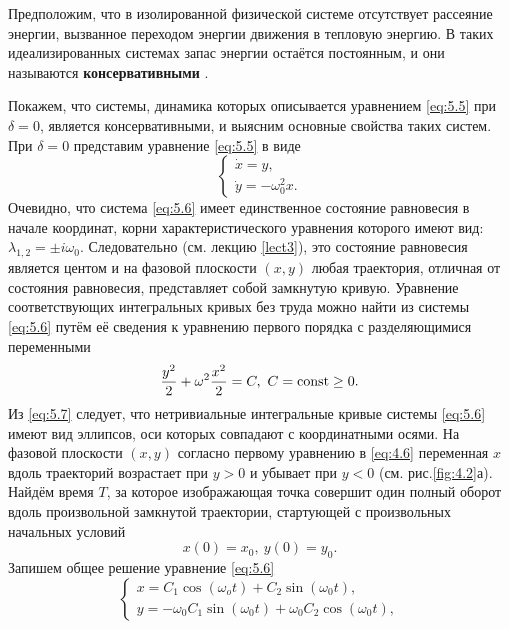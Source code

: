 Предположим, что в изолированной физической системе отсутствует
рассеяние энергии, вызванное переходом энергии движения в тепловую
энергию. В таких идеализированных системах запас энергии остаётся
постоянным, и они называются \textbf{консервативными} .

Покажем, что системы, динамика которых описывается уравнением \eqref{eq:5.5}    
при $\delta = 0$, является консервативными, и выясним основные свойства таких
систем. При $\delta = 0$ представим уравнение \eqref{eq:5.5} в виде
\begin{equation}
        \label{eq:5.6}
        \begin{cases}
                \dot x = y, \\
                \dot y = - \omega_0^2 x.
        \end{cases}
\end{equation}
Очевидно, что система \eqref{eq:5.6} имеет единственное состояние равновесия в начале координат, корни характеристического уравнения которого имеют вид: $\lambda_{1,2} = \pm i \omega_0$. Следовательно (см. лекцию \ref{lect3}), это состояние равновесия является центом и на фазовой плоскости $(x,y)$ любая траектория, отличная от состояния
равновесия, представляет собой замкнутую кривую. Уравнение
соответствующих интегральных кривых без труда можно найти из системы
 \eqref{eq:5.6} путём её сведения к уравнению первого порядка с разделяющимися
переменными 
\begin{equation}
        \label{eq:5.7}
        \frac{y^2}{2} + \omega^2 \frac{x^2}{2} = C,~ C= \textrm{const}\geq0.
\end{equation}
Из \eqref{eq:5.7} следует, что нетривиальные интегральные кривые системы \eqref{eq:5.6} имеют вид эллипсов, оси которых совпадают с координатными осями. На фазовой плоскости $(x,y)$ согласно первому уравнению
в \eqref{eq:4.6} переменная $x$ вдоль траекторий возрастает при $y>0$ и убывает при $y<0$ (см. рис.\ref{fig:4.2}а). Найдём время $T$, за которое изображающая точка совершит один полный оборот вдоль произвольной замкнутой траектории, стартующей с произвольных начальных условий
\begin{equation}
        \label{eq:5.8}
        x(0) = x_0,~ y(0) = y_0 . 
\end{equation}
Запишем общее решение уравнение \eqref{eq:5.6}
\begin{equation}
        \label{eq:5.9}
        \begin{cases}
                x = C_1 \cos(\omega_o t) + C_2 \sin(\omega_0t), \\
                y = - \omega_0 C_1 \sin(\omega_0t) +\omega_0C_2\cos(\omega_0t),
        \end{cases}
\end{equation}
